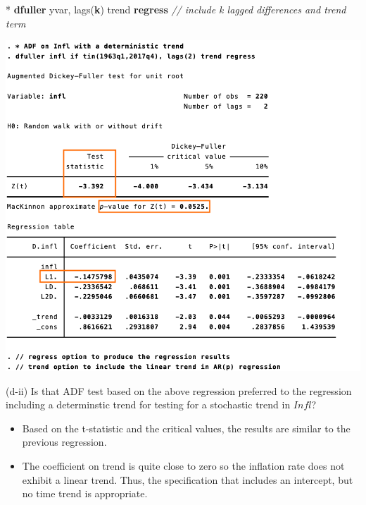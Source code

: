 \documentclass[
  10pt,
  ignorenonframetext,
]{beamer}
\newenvironment{Shaded}{\begin{snugshade}}{\end{snugshade}}
\newcommand{\CommentTok}[1]{\textcolor[rgb]{0.56,0.35,0.01}{\textit{#1}}}
\newcommand{\KeywordTok}[1]{\textcolor[rgb]{0.13,0.29,0.53}{\textbf{#1}}}
\newcommand{\NormalTok}[1]{#1}
\begin{document}
\begin{frame}[fragile]{}
\protect\hypertarget{section-2}{}
\small

\begin{Shaded}
\begin{Highlighting}[]
\NormalTok{* }\KeywordTok{dfuller}\NormalTok{ yvar, lags(}\KeywordTok{k}\NormalTok{) trend }\KeywordTok{regress}
\CommentTok{// include \textquotesingle{}k\textquotesingle{} lagged differences and trend term}
\end{Highlighting}
\end{Shaded}

\begin{flushleft}\includegraphics[width=0.7\linewidth]{pictures/(d-ii)ADFtest-deterministic} \end{flushleft}
\end{frame}

\begin{frame}{(d-ii) Is that ADF test based on the above regression
preferred to the regression including a determinstic trend for testing
for a stochastic trend in \(Infl\)?}
\protect\hypertarget{d-ii-is-that-adf-test-based-on-the-above-regression-preferred-to-the-regression-including-a-determinstic-trend-for-testing-for-a-stochastic-trend-in-infl-1}{}
\begin{itemize}
\item
  Based on the t-statistic and the critical values, the results are
  similar to the previous regression.
\item
  The coefficient on trend is quite close to zero so the inflation rate
  does not exhibit a linear trend. Thus, the specification that includes
  an intercept, but no time trend is appropriate.
\end{itemize}
\end{frame}
\end{document}
